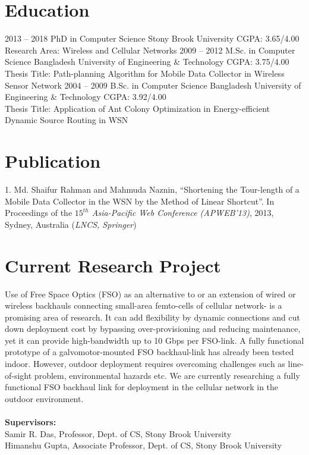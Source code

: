 \documentclass[]{friggeri-cv} %
\begin{document}
\section{Education}
\begin{entrylist} 
\entry
{2013 -- 2018}
{PhD in Computer Science}
{Stony Brook University}
{CGPA: 3.65/4.00\\  Research Area: Wireless and Cellular Networks}
\entry
{2009 -- 2012}
{M.Sc. in  Computer Science}
{Bangladesh University of Engineering \& Technology}
{CGPA: 3.75/4.00\\ 
Thesis Title: Path-planning Algorithm for Mobile Data Collector in Wireless
Sensor Network}
\entry  
{2004 -- 2009}
{B.Sc. in  Computer Science}
{Bangladesh University of Engineering \& Technology}
{CGPA: 3.92/4.00\\ 
Thesis Title: Application of Ant Colony Optimization in Energy-efficient Dynamic
Source Routing in WSN}
\end{entrylist}
\section{Publication}
1. Md. Shaifur Rahman and Mahmuda Naznin, ``Shortening the Tour-length of a Mobile Data Collector
  in the WSN by the Method of Linear Shortcut''. In Proceedings of the
  \textit{$15^{th}$ Asia-Pacific Web Conference (APWEB'13)}, 2013, Sydney,
  Australia (\textit{LNCS, Springer})
\section{Current Research Project}
Use of Free Space Optics (FSO) as an alternative to or an extension of wired or
wireless backhauls connecting small-area femto-cells of cellular network- is a
promising area of research. It can add flexibility by dynamic connections and 
cut down deployment cost by bypassing over-provisioning and reducing
maintenance, yet it can provide high-bandwidth up to 10 Gbps per FSO-link.
A fully functional prototype of a galvomotor-mounted FSO backhaul-link has
 already been tested
indoor. However, outdoor deployment requires overcoming challenges such as
line-of-sight problem, environmental hazards etc. We are currently
researching a fully functional  FSO backhaul link for deployment in the cellular
network in the outdoor environment.\\ \\
\textbf{Supervisors:} \\
\bullet{ } Samir R. Das, Professor, Dept. of CS, Stony Brook University\\
\bullet{ } Himanshu Gupta, Associate Professor, Dept. of CS, Stony Brook
University
\end{document}

